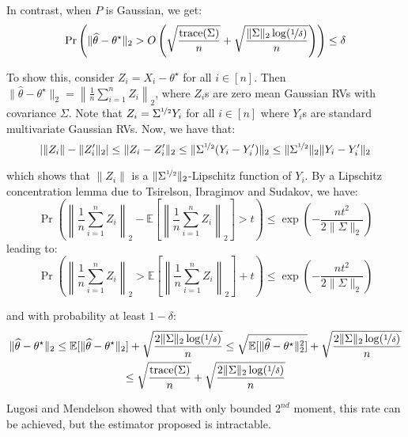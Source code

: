 \documentclass{article}
\theoremstyle{remark}
\theoremstyle{defintiion}
\newcommand{\Exp}{\mathbb{E}}
\newcommand{\trace}{\mathrm{trace}}
\newcommand{\eparam}{\widehat{\theta}}
\newcommand{\tparam}{\theta^{\star}}
\begin{document}
In contrast, when \(P\) is Gaussian, we get:
\begin{equation*}
\Pr\left(\|\eparam - \tparam\|_{2} > O\left(\sqrt{\frac{\trace(\Sigma)}{n}} + \sqrt{\frac{\|\Sigma\|_{2}\log(\nicefrac{1}{\delta})}{n}}\right)\right) \leq \delta
\end{equation*}

To show this, consider \(Z_{i} = X_{i} - \tparam\) for all \(i \in [n]\). Then \(\|\eparam - \tparam\|_{2} = \left\|\frac{1}{n}\sum\limits_{i=1}^{n}Z_{i}\right\|_{2}\), where \(Z_{i}\)s are zero mean Gaussian RVs with covariance \(\Sigma\). Note that \(Z_{i} = \Sigma^{\nicefrac{1}{2}}Y_{i}\) for all \(i \in [n]\) where \(Y_{i}\)s are standard multivariate Gaussian RVs. Now, we have that:
\begin{equation*}
|\|Z_{i}\| - \|Z'_{i}\|_{2}| \leq \|Z_{i} - Z'_{i}\|_{2} \leq \|\Sigma^{\nicefrac{1}{2}}(Y_{i} - Y'_{i})\|_{2} \leq \|\Sigma^{\nicefrac{1}{2}}\|_{2}\|Y_{i} - Y'_{i}\|_{2}
\end{equation*}

which shows that \(\|Z_{i}\|\) is a \(\|\Sigma^{\nicefrac{1}{2}}\|_{2}\)-Lipschitz function of \(Y_{i}\). By a Lipschitz concentration lemma due to Tsirelson, Ibragimov and Sudakov, we have:
\begin{equation*}
\Pr\left(\left\|\frac{1}{n} \sum_{i=1}^{n} Z_{i}\right\|_{2} - \Exp\left[\left\|\frac{1}{n} \sum_{i=1}^{n} Z_{i}\right\|_{2}\right] > t\right) \leq \exp\left(-\frac{nt^{2}}{2\|\Sigma\|_{2}}\right)
\end{equation*}
leading to:
\begin{equation*}
\Pr\left(\left\|\frac{1}{n} \sum_{i=1}^{n} Z_{i}\right\|_{2} > \Exp\left[\left\|\frac{1}{n} \sum_{i=1}^{n} Z_{i}\right\|_{2}\right] + t\right) \leq \exp\left(-\frac{nt^{2}}{2\|\Sigma\|_{2}}\right)
\end{equation*}

and with probability at least \(1 - \delta\):
\begin{multline*}
\|\eparam - \tparam\|_{2} \leq \Exp[\|\eparam - \tparam\|_{2}] + \sqrt{\frac{2\|\Sigma\|_{2}\log(\nicefrac{1}{\delta})}{n}} \leq \sqrt{\Exp[\|\eparam - \tparam\|_{2}^{2}]} + \sqrt{\frac{2\|\Sigma\|_{2}\log(\nicefrac{1}{\delta})}{n}} \\\leq \sqrt{\frac{\trace(\Sigma)}{n}} + \sqrt{\frac{2\|\Sigma\|_{2}\log(\nicefrac{1}{\delta})}{n}}
\end{multline*}

Lugosi and Mendelson showed that with only bounded \(2^{nd}\) moment, this rate can be achieved, but the estimator proposed is intractable.
\end{document}

